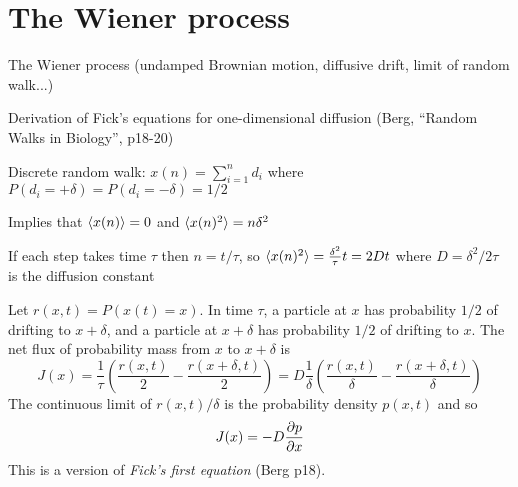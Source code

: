 \documentclass{beamer}
\begin{document}
\section{The Wiener process}

\begin{frame}{}

The Wiener process (undamped Brownian motion, diffusive drift, limit of random walk...)
 \itemb
 \item Derivation of Fick's equations for one-dimensional diffusion (Berg, ``Random Walks in Biology'', p18-20)
  \itemb
  \item Discrete random walk: $x(n) = \sum_{i=1}^n d_i$ where $P(d_i = +\delta) = P(d_i = -\delta) = 1/2$
   \itemb
   \item Implies that $\langle x(n) \rangle = 0$ and $\langle x(n)^2 \rangle = n \delta^2$
   \item If each step takes time $\tau$ then $n = t/\tau$, so $\langle x(n)^2 \rangle = \frac{\delta^2}{\tau} t = 2Dt$
where $D = \delta^2/2\tau$ is the diffusion constant
   \item Let $r(x,t) = P(x(t)=x)$.
In time $\tau$, a particle at $x$ has probability $1/2$ of drifting to $x+\delta$, and a particle at $x+\delta$ has probability $1/2$ of drifting to $x$.
The net flux of probability mass from $x$ to $x+\delta$ is
\[
J(x) = \frac{1}{\tau} \left( \frac{r(x,t)}{2} - \frac{r(x+\delta,t)}{2} \right)
= D \frac{1}{\delta} \left( \frac{r(x,t)}{\delta} - \frac{r(x+\delta,t)}{\delta} \right)
\]
The continuous limit of $r(x,t)/\delta$ is the probability density $p(x,t)$ and so
\[
J(x) = -D \frac{\partial {p}}{\partial {x}}
\]
This is a version of {\em Fick's first equation} (Berg p18).


\end{frame}
\end{document}
